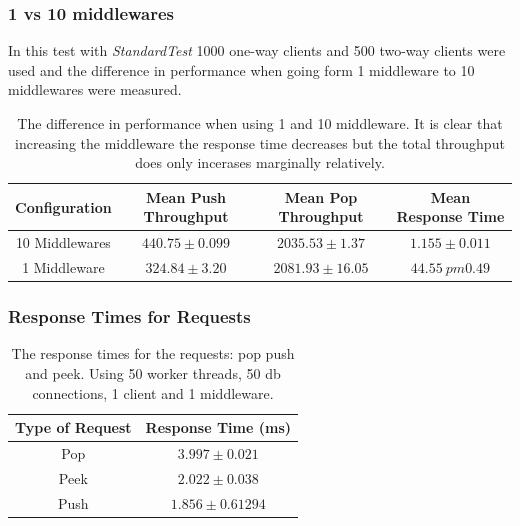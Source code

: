 \documentclass{article}
\begin{document}
        \subsubsection{1 vs 10 middlewares}    
            In this test with \textit{StandardTest} 1000 one-way clients and 500 two-way clients were used and the difference in performance when going form 1 middleware to 10 middlewares were measured.
            
            \begin{table}
            	\begin{tabular}{|c|c|c|c|}
            	\hline 
            	Configuration & Mean Push Throughput & Mean Pop Throughput & Mean Response Time \\ 
            	\hline 
            	10 Middlewares & $440.75  \pm 0.099$ & $2035.53 \pm 1.37$ & $1.155 \pm 0.011$ \\ 
            	\hline 
            	1 Middleware & $324.84 \pm 3.20$ & $2081.93 \pm 16.05$ & $44.55 \ pm 0.49$ \\ 
            	\hline 
            	\end{tabular} 
                \caption{The difference in performance when using 1 and 10 middleware. It is clear that increasing the middleware the response time decreases but the total throughput does only incerases marginally relatively.}
                \label{tbl:differnce_1_and_10_mw}
            \end{table}
            
        \subsubsection{Response Times for Requests}
                \begin{table}
                    \begin{tabular}{|c|c|}
                        \hline 
                        \textbf{Type of Request} & \textbf{Response Time} (ms) \\ 
                        \hline 
                        Pop & $3.997 \pm 0.021$ \\ 
                        \hline 
                        Peek & $2.022 \pm 0.038$ \\ 
                        \hline 
                        Push & $1.856 \pm 0.61294$ \\ 
                        \hline 
                    \end{tabular} 
                    \caption{The response times for the requests: pop push and peek. Using 50 worker threads, 50 db connections, 1 client and 1 middleware.}
                    \label{tbl:response_times_requests}
                \end{table}
\end{document}
